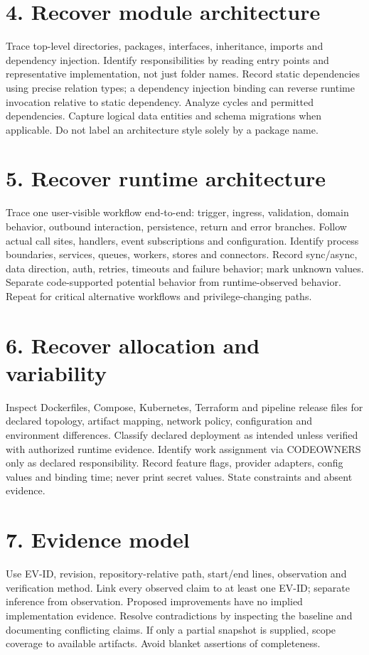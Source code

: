 \documentclass[11pt,letterpaper]{article}
\begin{document}
\section*{4. Recover module architecture}
Trace top-level directories, packages, interfaces, inheritance, imports and dependency injection. Identify responsibilities by reading entry points and representative implementation, not just folder names. Record static dependencies using precise relation types; a dependency injection binding can reverse runtime invocation relative to static dependency. Analyze cycles and permitted dependencies. Capture logical data entities and schema migrations when applicable. Do not label an architecture style solely by a package name.\par\smallskip
\section*{5. Recover runtime architecture}
Trace one user-visible workflow end-to-end: trigger, ingress, validation, domain behavior, outbound interaction, persistence, return and error branches. Follow actual call sites, handlers, event subscriptions and configuration. Identify process boundaries, services, queues, workers, stores and connectors. Record sync/async, data direction, auth, retries, timeouts and failure behavior; mark unknown values. Separate code-supported potential behavior from runtime-observed behavior. Repeat for critical alternative workflows and privilege-changing paths.\par\smallskip
\section*{6. Recover allocation and variability}
Inspect Dockerfiles, Compose, Kubernetes, Terraform and pipeline release files for declared topology, artifact mapping, network policy, configuration and environment differences. Classify declared deployment as intended unless verified with authorized runtime evidence. Identify work assignment via CODEOWNERS only as declared responsibility. Record feature flags, provider adapters, config values and binding time; never print secret values. State constraints and absent evidence.\par\smallskip
\section*{7. Evidence model}
Use EV-ID, revision, repository-relative path, start/end lines, observation and verification method. Link every observed claim to at least one EV-ID; separate inference from observation. Proposed improvements have no implied implementation evidence. Resolve contradictions by inspecting the baseline and documenting conflicting claims. If only a partial snapshot is supplied, scope coverage to available artifacts. Avoid blanket assertions of completeness.\par\smallskip
\end{document}
